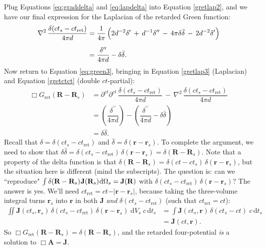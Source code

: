 \documentclass[12pt]{article}
\renewcommand{\vv}[1]{\mathbf{#1}}
\newcommand{\dd}[1]{\mathrm{d}#1}
\begin{document}
Plug Equations \ref{eq:graddelta} and \ref{eq:lapdelta} into Equation \ref{gretlap2}, and we have our final expression for the Laplacian of the retarded Green function:
\begin{equation}\label{gretlap3}
\begin{split}
\nabla^2 \, \dfrac{\delta ( ct_{s} - ct_{\textrm{ret}} )}{4 \pi d} &= \dfrac{1}{4 \pi} \, \Bigl( 2 d^{-2} \delta^\prime \, + \, d^{-1} \delta^{\prime \prime}  \, - \, 4 \pi \delta \bar{\delta} \, - \, 2 d^{-2} \delta^\prime \Bigr) \\[6pt]
&= \dfrac{\delta^{\prime \prime}}{4 \pi d} - \delta \bar{\delta} .
\end{split}
\end{equation}
Now return to Equation \ref{eq:green3}, bringing in Equation \ref{gretlap3} (Laplacian) and Equation \ref{gretctct} (double $ct$-partial):
\begin{equation*}
\begin{aligned}
\Box G_{\textrm{ret}} (\vv R - \vv R_{s}) &= \partial^{ct} \partial^{ct} \, \dfrac{\delta ( ct_{s} - ct_{\textrm{ret}} )}{4 \pi d} \, - \, \nabla^2 \, \dfrac{\delta ( ct_{s} - ct_{\textrm{ret}} )}{4 \pi d} \\[4pt]
&= \left( \dfrac{\delta^{\prime \prime}}{4 \pi d} \right) - \left( \dfrac{\delta^{\prime \prime}}{4 \pi d} - \delta \bar{\delta} \right) \\[5pt]
&= \delta \bar{\delta} .
\end{aligned}
\end{equation*}
Recall that $\delta = \delta(ct_{s} - ct_{\textrm{ret}})$ and $\bar{\delta} = \delta(\vv r - \vv r_{s})$. To complete the argument, we need to show that $\delta \bar{\delta} = \delta(ct_{s} - ct_{\textrm{ret}}) \, \delta(\vv r - \vv r_{s}) = \delta ( \vv R - \vv R_{s} )$. Note that a property of the delta function is that $\delta ( \vv R - \vv R_{s} ) = \delta(ct - ct_{s}) \, \delta(\vv r - \vv r_{s})$, but the situation here is different (mind the subscripts). The question is: can we ``reproduce" $\int \delta (\vv R - \vv R_{s}) \mkern1mu \vv J (\vv R_{s}) \mkern1mu \dd \Omega_{s} = \vv J (\vv R)$ with $\delta(ct_{s} - ct_{\textrm{ret}}) \, \delta(\vv r - \vv r_{s})$? The answer is yes. We'll need $ct_{\textrm{ret}} = ct - \vert \vv r - \vv r_{s} \vert$, because taking the three-volume integral turns $\vv r_{s}$ into $\vv r$ in both $\vv J$ \emph{and} $\delta(ct_{s} - ct_{\textrm{ret}})$ (such that $ct_{\textrm{ret}} = ct$):
\begin{equation*}
\begin{aligned}
\iint \vv J (ct_{s}, \vv r_{s}) \, \delta(ct_{s} - ct_{\textrm{ret}}) \, \delta(\vv r - \vv r_{s}) \; \dd V_{s} \; c \, \dd t_{s} &= \int \vv J (ct_{s}, \vv r) \, \delta(ct_{s} - ct) \; c \, \dd t_{s} \\[4pt]
&= \vv J(ct, \vv r) .
\end{aligned}
\end{equation*}
So $\Box G_{\textrm{ret}}( \vv R - \vv R_{s} ) = \delta ( \vv R - \vv R_{s} )$, and the retarded four-potential \emph{is} a solution to $\Box \vv A = \vv J$.
\end{document}
